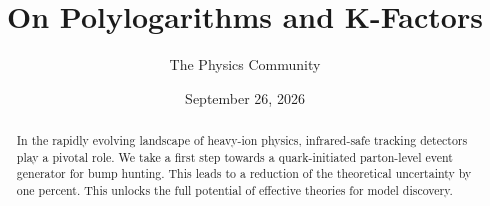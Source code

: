 \documentclass[11pt]{article}
\title{On Polylogarithms and K-Factors}
\author{The Physics Community}
\date{September 26, 2026}
\numberwithin{equation}{section}
\theoremstyle{definition}
\theoremstyle{remark}
\begin{document}
\maketitle
\begin{abstract}
In the rapidly evolving landscape of heavy-ion physics, infrared-safe
tracking detectors play a pivotal role. We take a first step towards a
quark-initiated parton-level event generator for bump hunting. This
leads to a reduction of the theoretical uncertainty by one percent. This
unlocks the full potential of effective theories for model discovery.
\end{abstract}
\tableofcontents





\nocite{*}


\end{document}
